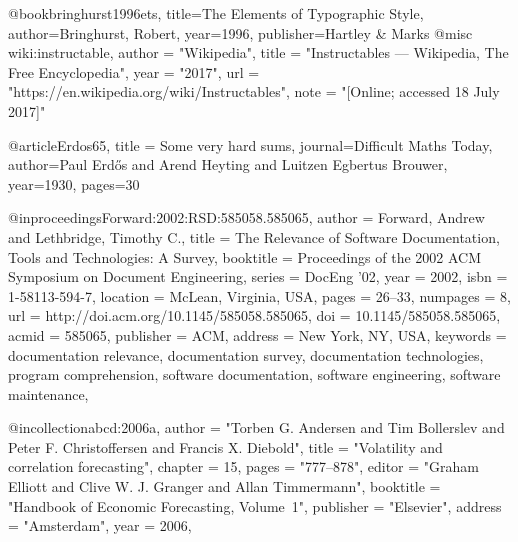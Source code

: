 @book{bringhurst1996ets,
	title={{The Elements of Typographic Style}},
	author={Bringhurst, Robert},
	year={1996},
	publisher={Hartley \& Marks}
}
@misc{ wiki:instructable,
	author = "Wikipedia",
	title = "Instructables --- {W}ikipedia{,} The Free Encyclopedia",
	year = "2017",
	url = "{https://en.wikipedia.org/wiki/Instructables}",
	note = "[Online; accessed 18 July 2017]"
}

@article{Erdos65,
	title = {Some very hard sums},
	journal={Difficult Maths Today},
	author={Paul Erd\H{o}s and Arend Heyting and Luitzen Egbertus Brouwer},
	year={1930},
	pages={30}
}

@inproceedings{Forward:2002:RSD:585058.585065,
	author = {Forward, Andrew and Lethbridge, Timothy C.},
	title = {The Relevance of Software Documentation, Tools and Technologies: A Survey},
	booktitle = {Proceedings of the 2002 ACM Symposium on Document Engineering},
	series = {DocEng '02},
	year = {2002},
	isbn = {1-58113-594-7},
	location = {McLean, Virginia, USA},
	pages = {26--33},
	numpages = {8},
	url = {http://doi.acm.org/10.1145/585058.585065},
	doi = {10.1145/585058.585065},
	acmid = {585065},
	publisher = {ACM},
	address = {New York, NY, USA},
	keywords = {documentation relevance, documentation survey, documentation technologies, program comprehension, software documentation, software engineering, software maintenance},
} 

@incollection{abcd:2006a,
	author      = "Torben G. Andersen and Tim Bollerslev and 
	Peter F. Christoffersen and Francis X. 
	Diebold",
	title       = "Volatility and correlation forecasting",
	chapter     = 15,
	pages       = "777--878",
	editor      = "Graham Elliott and Clive W. J. Granger and 
	Allan Timmermann",
	booktitle   = "Handbook of Economic Forecasting, 
	Volume~1",
	publisher   = "Elsevier",
	address     = "Amsterdam",
	year        = 2006,
}
